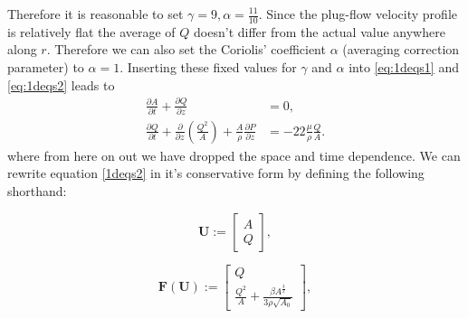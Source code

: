 \documentclass[a4paper, oneside]{discothesis}
\begin{document}
Therefore it is reasonable to set $\gamma = 9, \alpha = \frac{11}{10}$.
Since the plug-flow velocity profile is relatively flat the average of $Q$ doesn't differ from the actual value anywhere along $r$.
Therefore we can also set the Coriolis' coefficient $\alpha$ (averaging correction parameter) to $\alpha = 1$. \cite{formaggia2010cardiovascular}
Inserting these fixed values for $\gamma$ and $\alpha$ into \autoref{eq:1deqs1} and \autoref{eq:1deqs2} leads to 
\begin{equation}
	\begin{aligned} 
		\frac{\partial A}{\partial t} + \frac{\partial Q}{\partial z} &= 0, \\ 
		\frac{\partial Q}{\partial t} + \frac{\partial}{\partial z}\left(\frac{Q^2}{A} \right) + \frac{A}{\rho} \frac{\partial P}{\partial z} &= -22 \frac{\mu}{\rho} \frac{Q}{A}.
	\end{aligned} \label{1deqs2}
\end{equation}
where from here on out we have dropped the space and time dependence.
We can rewrite equation \ref{1deqs2} in it's conservative form by defining the following shorthand:

\begin{equation}
	\mathbf{U} := 
	\begin{bmatrix}
		A \\
		Q
	\end{bmatrix},
\end{equation}

\begin{equation}
	\mathbf{F} \left( \mathbf{U} \right) := 
	\begin{bmatrix}
		Q \\
		\frac{Q^2}{A} + \frac{\beta A^{\frac{3}{2}}}{3\rho\sqrt{A_0}}
	\end{bmatrix},
\end{equation}
\end{document}
